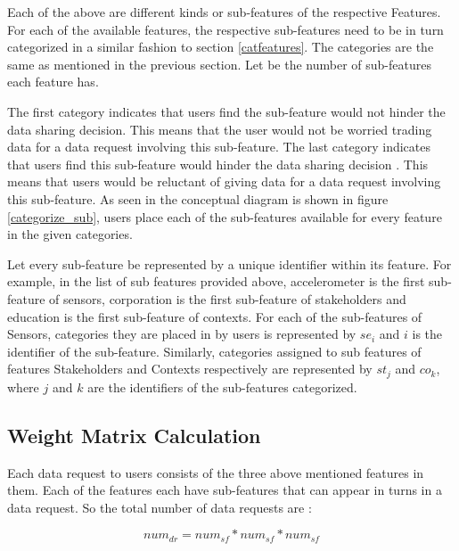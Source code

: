Each of the above are different kinds or sub-features of the respective Features. 
For each of the available features, the respective sub-features need to be in turn categorized in a similar fashion to section \ref{catfeatures}.
The categories are the same as mentioned in the previous section. Let \numsubfeatures be the number of sub-features each feature has.


The first category indicates that users find the sub-feature would not hinder the data sharing decision. This means that the user would not be worried trading data for a data request involving this sub-feature. The last category indicates that users find this sub-feature would hinder the data sharing decision . This means that users would be reluctant of giving data for a data request involving this sub-feature. As seen in the conceptual diagram is shown in figure \ref{categorize_sub}, users place each of the sub-features available for every feature in the given categories.

Let every sub-feature be represented by a unique identifier within its feature. For example, in the list of sub features provided above, accelerometer is the first sub-feature of sensors, corporation is the first sub-feature of stakeholders and education is the first sub-feature of contexts. For each of the sub-features of Sensors, categories they are placed in by users is represented by $se_{i}$ and $i$ is the identifier
of the sub-feature. Similarly, categories assigned to sub features of features Stakeholders and Contexts respectively are represented by $st_{j}$ and $co_{k}$, where $j$ and $k$ are the identifiers of the sub-features categorized.

\subsection{Weight Matrix Calculation}
Each data request to users consists of the three above mentioned features in them. Each of the features each have \numsubfeatures sub-features that can appear in turns in a data request. So the total number of data requests are :

\begin{equation}
num_{dr} =  num_{sf} * num_{sf} * num_{sf}   
\end{equation}

